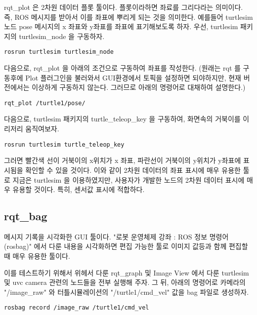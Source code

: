 rqt\_plot 은 2차원 데이터 플롯 툴이다. 플롯이라하면 좌료를 그리다라는 의미이다. 즉, ROS 메시지를 받아서 이를 좌표에 뿌리게 되는 것을 의미한다. 예를들어 turtlesim 노드 pose 메시지의 x 좌표와  y좌표를 좌표에 표기해보도록 하자. 우선, turtlesim 패키지의 turtlesim\_node 을 구동하자.

\begin{lstlisting}[language=ros]
rosrun turtlesim turtlesim_node 
\end{lstlisting}

다음으로, rqt\_plot 을 아래의 조건으로 구동하여 좌표를 작성한다. (원래는 rqt 를 구동후에 Plot 플러그인을 불러와서 GUI환경에서 토픽을 설정하면 되야하지만, 현재 버전에서는 이상하게 구동하지 않는다. 그러므로 아래의 명령어로 대채하여 설명한다.)

\begin{lstlisting}[language=ros]
rqt_plot /turtle1/pose/
\end{lstlisting}

다음으로, turtlesim 패키지의 turtle\_teleop\_key 을 구동하여, 화면속의 거북이를 이리저리 움직여보자.

\begin{lstlisting}[language=ros]
rosrun turtlesim turtle_teleop_key
\end{lstlisting}

그러면 빨간색 선이 거북이의 x위치가 x 좌표, 파란선이 거북이의 y위치가 y좌표에 표시됨을 확인할 수 있을 것이다. 이와 같이 2차원 데이터의 좌표 표시에 매우 유용한 툴로 지금은 turtlesim 을 이용하였지만, 사용자가 개발한 노드의 2차원 데이터 표시에 매우 유용할 것이다. 특히, 센서값 표시에 적합하다.

\subsection{rqt\_bag}

메시지 기록을 시각화한 GUI 툴이다. "로봇 운영체제 강좌 : ROS 정보 명령어 (rosbag)" 에서 다룬 내용을 시각화하면 편집 가능한 툴로 이미지 값등과 함께 편집할 때 매우 유용한 툴이다.

이를 테스트하기 위해서 위헤서 다룬 rqt\_graph 및 Image View 에서 다룬 turtlesim 및 uvc camera 관련의 노드들을 전부 실행해 주자. 그 뒤, 아래의 명령어로 카메라의 "/image\_raw" 와 터틀시뮬레이션의 "/turtle1/cmd\_vel" 값을 bag 파일로 생성하자.

\begin{lstlisting}[language=ros]
rosbag record /image_raw /turtle1/cmd_vel
\end{lstlisting}

